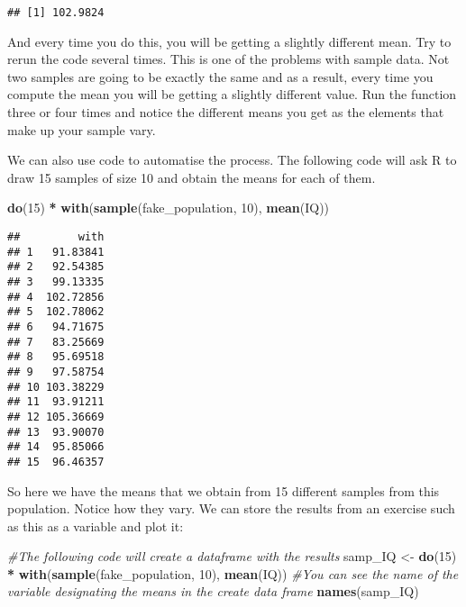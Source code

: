 \documentclass[
]{book}
\newenvironment{Shaded}{\begin{snugshade}}{\end{snugshade}}
\newcommand{\CommentTok}[1]{\textcolor[rgb]{0.56,0.35,0.01}{\textit{#1}}}
\newcommand{\DecValTok}[1]{\textcolor[rgb]{0.00,0.00,0.81}{#1}}
\newcommand{\FunctionTok}[1]{\textcolor[rgb]{0.13,0.29,0.53}{\textbf{#1}}}
\newcommand{\NormalTok}[1]{#1}
\newcommand{\OtherTok}[1]{\textcolor[rgb]{0.56,0.35,0.01}{#1}}
\newcommand{\SpecialCharTok}[1]{\textcolor[rgb]{0.81,0.36,0.00}{\textbf{#1}}}
\begin{document}
\begin{Shaded}
\end{Shaded}

\begin{verbatim}
## [1] 102.9824
\end{verbatim}

And every time you do this, you will be getting a slightly different mean. Try to rerun the code several times. This is one of the problems with sample data. Not two samples are going to be exactly the same and as a result, every time you compute the mean you will be getting a slightly different value. Run the function three or four times and notice the different means you get as the elements that make up your sample vary.

We can also use code to automatise the process. The following code will ask R to draw 15 samples of size 10 and obtain the means for each of them.

\begin{Shaded}
\begin{Highlighting}[]
\FunctionTok{do}\NormalTok{(}\DecValTok{15}\NormalTok{) }\SpecialCharTok{*} \FunctionTok{with}\NormalTok{(}\FunctionTok{sample}\NormalTok{(fake\_population, }\DecValTok{10}\NormalTok{), }\FunctionTok{mean}\NormalTok{(IQ))}
\end{Highlighting}
\end{Shaded}

\begin{verbatim}
##         with
## 1   91.83841
## 2   92.54385
## 3   99.13335
## 4  102.72856
## 5  102.78062
## 6   94.71675
## 7   83.25669
## 8   95.69518
## 9   97.58754
## 10 103.38229
## 11  93.91211
## 12 105.36669
## 13  93.90070
## 14  95.85066
## 15  96.46357
\end{verbatim}

So here we have the means that we obtain from 15 different samples from this population. Notice how they vary. We can store the results from an exercise such as this as a variable and plot it:

\begin{Shaded}
\begin{Highlighting}[]
\CommentTok{\#The following code will create a dataframe with the results}
\NormalTok{samp\_IQ }\OtherTok{\textless{}{-}} \FunctionTok{do}\NormalTok{(}\DecValTok{15}\NormalTok{) }\SpecialCharTok{*} \FunctionTok{with}\NormalTok{(}\FunctionTok{sample}\NormalTok{(fake\_population, }\DecValTok{10}\NormalTok{), }\FunctionTok{mean}\NormalTok{(IQ))}
\CommentTok{\#You can see the name of the variable designating the means in the create data frame}
\FunctionTok{names}\NormalTok{(samp\_IQ)}
\end{Highlighting}
\end{Shaded}
\end{document}
